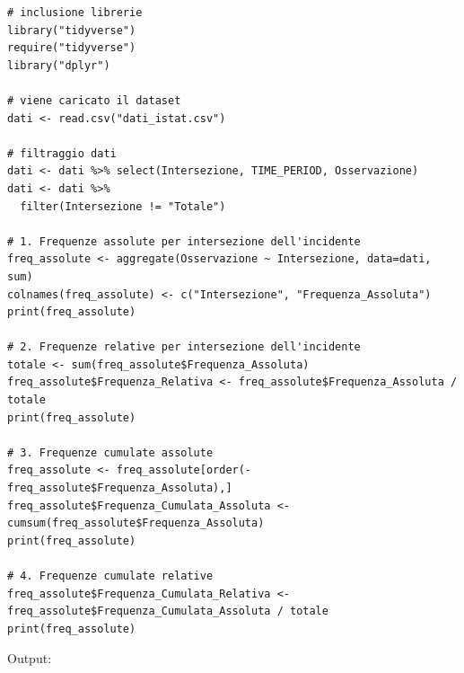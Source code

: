 \documentclass[14pt, openany, titlepage]{report} %
\begin{document}
\begin{center}
\begin{lstlisting}[breaklines=true]
# inclusione librerie
library("tidyverse")
require("tidyverse")
library("dplyr")

# viene caricato il dataset
dati <- read.csv("dati_istat.csv")

# filtraggio dati
dati <- dati %>% select(Intersezione, TIME_PERIOD, Osservazione) 
dati <- dati %>% 
  filter(Intersezione != "Totale") 

# 1. Frequenze assolute per intersezione dell'incidente
freq_assolute <- aggregate(Osservazione ~ Intersezione, data=dati, sum)
colnames(freq_assolute) <- c("Intersezione", "Frequenza_Assoluta")
print(freq_assolute)

# 2. Frequenze relative per intersezione dell'incidente
totale <- sum(freq_assolute$Frequenza_Assoluta)
freq_assolute$Frequenza_Relativa <- freq_assolute$Frequenza_Assoluta / totale
print(freq_assolute)

# 3. Frequenze cumulate assolute
freq_assolute <- freq_assolute[order(-freq_assolute$Frequenza_Assoluta),]
freq_assolute$Frequenza_Cumulata_Assoluta <- cumsum(freq_assolute$Frequenza_Assoluta)
print(freq_assolute)

# 4. Frequenze cumulate relative
freq_assolute$Frequenza_Cumulata_Relativa <- freq_assolute$Frequenza_Cumulata_Assoluta / totale
print(freq_assolute)
\end{lstlisting}  
\end{center}

\noindent
Output: 

\begin{table}[H]
\centering
\begin{minipage}{\linewidth} 
\footnotesize
\centering
{}
\end{minipage}
\end{table}
\end{document}

